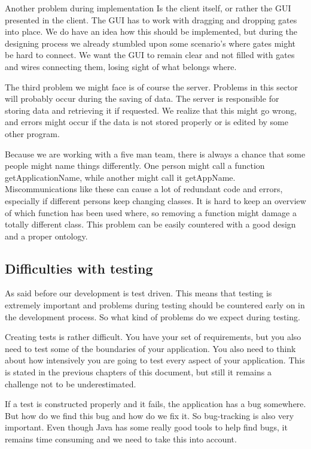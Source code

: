 \documentclass[a4paper]{article}
\begin{document}
Another problem during implementation Is the client itself, or rather the GUI presented in the client. The GUI has to work with dragging and dropping gates into place. We do have an idea how this should be implemented, but during the designing process we already stumbled upon some scenario’s where gates might be hard to connect. We want the GUI to remain clear and not filled with gates and wires connecting them, losing sight of what belongs where.

The third problem we might face is of course the server. Problems in this sector will probably occur during the saving of data. The server is responsible for storing data and retrieving it if requested. We realize that this might go wrong, and errors might occur if the data is not stored properly or is edited by some other program. 

Because we are working with a five man team, there is always a chance that some people might name things differently. One person might call a function getApplicationName, while another might call it getAppName. Miscommunications like these can cause a lot of redundant code and errors, especially if different persons keep changing classes. It is hard to keep an overview of which function has been used where, so removing a function might damage a totally different class. This problem can be easily countered with a good design and a proper ontology.

\subsection{Difficulties with testing}
As said before our development is test driven. This means that testing is extremely important and problems during testing should be countered early on in the development process. So what kind of problems do we expect during testing. 

Creating tests is rather difficult. You have your set of requirements, but you also need to test some of the boundaries of your application. You also need to think about how intensively you are going to test every aspect of your application. This is stated in the previous chapters of this document, but still it remains a challenge not to be underestimated.

If a test is constructed properly and it fails, the application has a bug somewhere. But how do we find this bug and how do we fix it. So bug-tracking is also very important. Even though Java has some really good tools to help find bugs, it remains time consuming and we need to take this into account.
\end{document}
